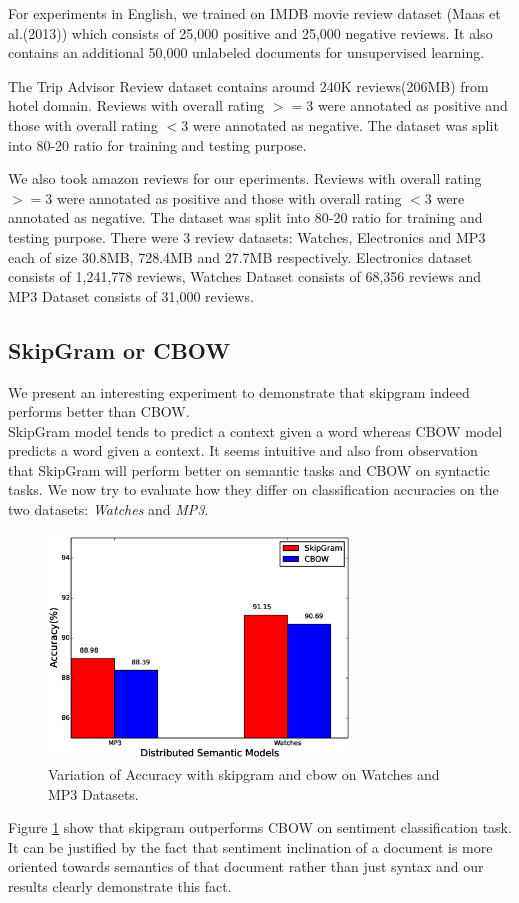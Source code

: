 \documentclass[11pt,a4paper]{article}
\begin{document}
For experiments in English, we trained on IMDB movie review dataset (Maas et al.(2013)) which consists of 25,000 positive and 25,000 negative reviews. It also contains an additional 50,000 unlabeled documents for unsupervised learning.

The Trip Advisor Review dataset contains around 240K reviews(206MB) from hotel domain. Reviews with overall rating $>=$3 were annotated as positive and those with overall rating $<$3 were annotated as negative. The dataset was split into 80-20 ratio for training and testing purpose.

We also took amazon reviews for our eperiments. Reviews with overall rating $>=$3 were annotated as positive and those with overall rating $<$3 were annotated as negative. The dataset was split into 80-20 ratio for training and testing purpose. There were 3 review datasets: Watches, Electronics and MP3 each of size 30.8MB, 728.4MB and 27.7MB respectively. Electronics dataset consists of 1,241,778 reviews, Watches Dataset consists of 68,356 reviews and MP3 Dataset consists of 31,000 reviews.

\subsection{SkipGram or CBOW}
We present an interesting experiment to demonstrate that skipgram indeed performs better than CBOW.\\
SkipGram model tends to predict a context given a word whereas CBOW model predicts a word given a context. It seems intuitive and also from observation~\cite{Mikolov:13b} that SkipGram will perform better on semantic tasks and CBOW on syntactic tasks. We now try to evaluate how they differ on classification accuracies on the two datasets: \emph{Watches} and \emph{MP3}.
\begin{figure}[ht!]
\centering
\includegraphics[width=80mm, height=60mm]{img/accuracy_sgcbow.eps}
\caption{Variation of Accuracy with skipgram and cbow on Watches and MP3 Datasets. \label{fig:accuracy_sgcbow}}
\end{figure}
Figure \ref{fig:accuracy_sgcbow} show that skipgram outperforms CBOW on sentiment classification task. It can be justified by the fact that sentiment inclination of a document is more oriented towards semantics of that document rather than just syntax and our results clearly demonstrate this fact.
\end{document}
